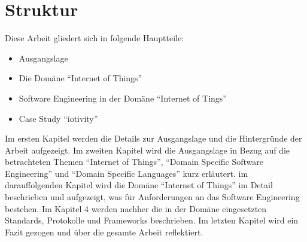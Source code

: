 \section{Struktur}
Diese Arbeit gliedert sich in folgende Hauptteile:

\begin{itemize}
\item Ausgangslage
\item Die Domäne "`Internet of Things"'
\item Software Engineering in der Domäne "`Internet of Tings"'
\item Case Study "`iotivity"'
\end{itemize}

Im ersten Kapitel werden die Details zur Ausgangslage und die Hintergründe der Arbeit aufgezeigt. Im zweiten Kapitel wird die Ausgangslage in Bezug auf die betrachteten Themen "`Internet of Things"', "`Domain Specific Software Engineering"' und "`Domain Specific Languages"' kurz erläutert. im darauffolgenden Kapitel wird die Domäne "`Internet of Things"' im Detail beschrieben und aufgezeigt, was für Anforderungen an das Software Engineering bestehen. Im Kapitel 4 werden nachher die in der Domäne eingesetzten Standards, Protokolle und Frameworks beschrieben. Im letzten Kapitel wird ein Fazit gezogen und über die gesamte Arbeit reflektiert.